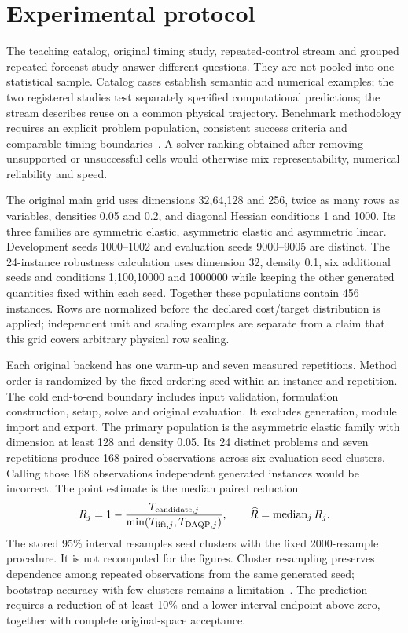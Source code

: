 \section{Experimental protocol}\label{sec:protocol}
The teaching catalog, original timing study, repeated-control stream and
grouped repeated-forecast study answer different questions. They are not
pooled into one statistical sample. Catalog cases establish semantic and
numerical examples; the two registered studies test separately specified
computational predictions; the stream describes reuse on a common physical
trajectory. Benchmark methodology requires an explicit problem population,
consistent success criteria and comparable timing boundaries~\cite{dolan,cutest}.
A solver ranking obtained after removing unsupported or unsuccessful cells
would otherwise mix representability, numerical reliability and speed.

The original main grid uses dimensions 32,64,128 and 256, twice as many rows
as variables, densities 0.05 and 0.2, and diagonal Hessian conditions 1 and 1000.
Its three families are symmetric elastic, asymmetric elastic and asymmetric
linear. Development seeds 1000--1002 and evaluation seeds 9000--9005 are
distinct. The 24-instance robustness calculation uses dimension 32, density 0.1,
six additional seeds and conditions 1,100,10000 and 1000000 while keeping the
other generated quantities fixed within each seed. Together these populations
contain 456 instances. Rows are normalized before the declared cost/target
distribution is applied; independent unit and scaling examples are separate
from a claim that this grid covers arbitrary physical row scaling.

Each original backend has one warm-up and seven measured repetitions.
Method order is randomized by the fixed ordering seed within an instance
and repetition. The cold end-to-end boundary includes input validation,
formulation construction, setup, solve and original evaluation. It excludes
generation, module import and export. The primary population is the asymmetric
elastic family with dimension at least 128 and density 0.05. Its 24 distinct
problems and seven repetitions produce 168 paired observations across six
evaluation seed clusters. Calling those 168 observations independent generated
instances would be incorrect. The point estimate is the median paired reduction
\begin{equation}\label{eq:original-score}
 R_j=1-\frac{T_{\mathrm{candidate},j}}
 {\min(T_{\mathrm{lift},j},T_{\mathrm{DAQP},j})},\qquad
 \widehat R=\operatorname{median}_j R_j.
\end{equation}
The stored 95\% interval resamples seed clusters with the fixed 2000-resample
procedure. It is not recomputed for the figures. Cluster resampling preserves
dependence among repeated observations from the same generated seed;
bootstrap accuracy with few clusters remains a limitation~\cite{efron,davison,cameron}.
The prediction requires a reduction of at least 10\% and a lower interval
endpoint above zero, together with complete original-space acceptance.

